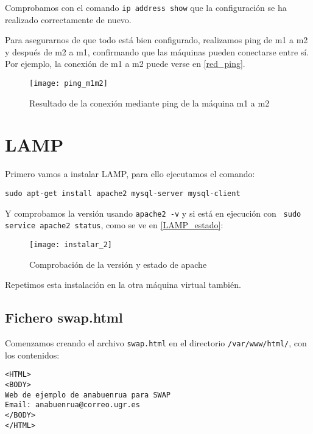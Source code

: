 Comprobamos con el comando \verb|ip address show| que la configuración se ha realizado correctamente de nuevo.

Para asegurarnos de que todo está bien configurado, realizamos ping de m1 a m2 y después de m2 a m1, confirmando que las máquinas pueden conectarse entre sí. Por ejemplo, la conexión de m1 a m2 puede verse en \eqref{red_ping}.

\begin{figure}[h!]
\begin{center}
\caption{Resultado de la conexión mediante ping de la máquina m1 a m2}
\label{red_ping}
\texttt{[image: ping\_m1m2]}
\end{center}
\end{figure}

\chapter{LAMP}

Primero vamos a instalar LAMP, para ello ejecutamos el comando:

\begin{verbatim}
sudo apt-get install apache2 mysql-server mysql-client
\end{verbatim}

Y comprobamos la versión usando \verb|apache2 -v| y si está en ejecución con \verb| sudo service apache2 status|, como se ve en \eqref{LAMP_estado}:

\begin{figure}[h!]
\begin{center}
\caption{Comprobación de la versión y estado de apache}
\label{LAMP_estado}
\texttt{[image: instalar\_2]}
\end{center}
\end{figure}

Repetimos esta instalación en la otra máquina virtual también.

\section{Fichero swap.html}

Comenzamos creando el archivo \verb|swap.html| en el directorio \verb|/var/www/html/|, con los contenidos:

\begin{verbatim}
<HTML>
<BODY>
Web de ejemplo de anabuenrua para SWAP
Email: anabuenrua@correo.ugr.es
</BODY>
</HTML>
\end{verbatim}

